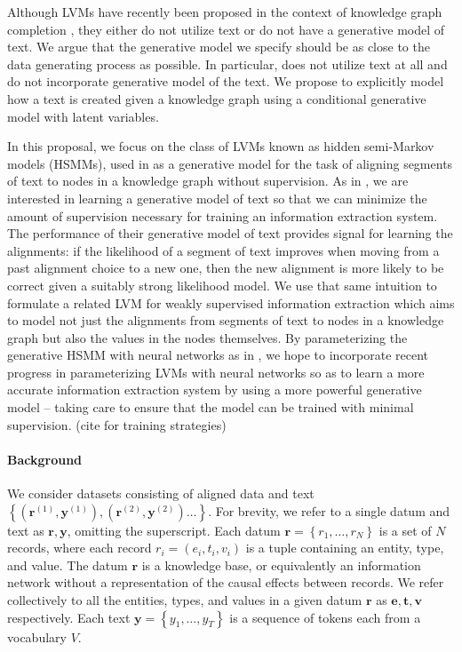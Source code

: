 \documentclass[11pt]{article}
\newcommand\set[1]{\left\{#1\right\}}
\newcommand{\be}{\mathbf{e}}
\newcommand{\br}{\mathbf{r}}
\newcommand{\bt}{\mathbf{t}}
\newcommand{\bv}{\mathbf{v}}
\newcommand{\by}{\mathbf{y}}
\begin{document}
Although LVMs have recently been proposed in the context of knowledge graph
completion \citep{chen2018diva,qu2017ssre}, they either do not utilize text
or do not have a generative model of text.
We argue that the generative model we specify should be as close to 
the data generating process as possible.
In particular, \citet{chen2018diva} does not utilize text at all
and \citet{qu2017ssre} do not incorporate generative model of the text.
We propose to explicitly model how a text is created given a knowledge graph
using a conditional generative model with latent variables.

In this proposal, we focus on the class of LVMs known as hidden semi-Markov models (HSMMs),
used in \citet{liang2009semalign} as a generative model for the
task of aligning segments of text to
nodes in a knowledge graph without supervision.
As in \citet{liang2009semalign}, we are interested in learning a generative model of text so that
we can minimize the amount of supervision necessary for training an information extraction system.
The performance of their generative model of text provides signal for learning the alignments:
if the likelihood of a segment of text improves when moving from a
past alignment choice to a new one,
then the new alignment is more likely to be correct given a suitably strong likelihood model.
We use that same intuition to formulate a related LVM for weakly supervised information extraction
which aims to model not just the alignments from segments of text to nodes in a knowledge graph
but also the values in the nodes themselves.
By parameterizing the generative HSMM with neural networks as in \citet{wiseman2018template},
we hope to incorporate recent progress in parameterizing LVMs with neural networks
so as to learn a more accurate information extraction system by using a more powerful
generative model -- taking care to ensure that the model can be trained with minimal supervision.
(cite \citet{deng2018attn} for training strategies)

\paragraph{Background}
We consider datasets consisting of aligned data and text
$\set{(\br^{(1)}, \by^{(1)}),(\br^{(2)},\by^{(2)})\ldots}$.
For brevity, we refer to a single datum and text as $\br,\by$, omitting the superscript.
Each datum $\br = \set{r_1,\ldots,r_N}$ is a set of $N$ records, where each record $r_i = (e_i, t_i, v_i)$
is a tuple containing an entity, type, and value.
The datum $\br$ is a knowledge base, or equivalently an information network
without a representation of the causal effects between records.
We refer collectively to all the entities, types, and values in a given datum $\br$ as
$\be,\bt,\bv$ respectively.
Each text $\by = \set{y_1,\ldots,y_T}$ is a sequence of tokens each from a vocabulary $V$.
\end{document}
